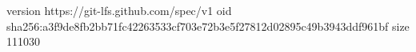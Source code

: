 version https://git-lfs.github.com/spec/v1
oid sha256:a3f9de8fb2bb71fc42263533cf703e72b3e5f27812d02895c49b3943ddf961bf
size 111030
